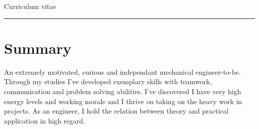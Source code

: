 \documentclass[letterpaper]{twentysecondcv} %
\begin{document}
\aboutme{} 
\skillstext{} 
\sprogtekst{} 



\makeprofile %

\begin{centering}
\vspace{5mm}
{ \Huge Curriculum vitae }\vspace{1mm} 
\hrule\vspace{3mm}
\end{centering}
\section{Summary}

An extremely motivated, curious and independant mechanical engineer-to-be. Through my studies I've developed exemplary skills with teamwork, communication and problem solving abilities. I've discovered I have very high energy levels and working morale and I thrive on taking on the heavy work in projects. As an engineer, I hold the relation between theory and practical application in high regard.  
\end{document}
